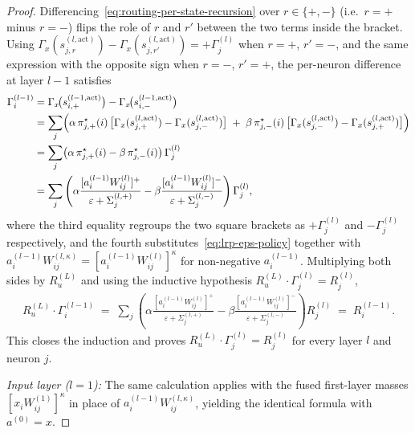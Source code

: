 \documentclass[twoside]{article}
\newcommand{\1}{\mathbf{1}}
\begin{document}
\begin{proof}
Differencing~\eqref{eq:routing-per-state-recursion} over $r \in \{+,-\}$ (i.e.\ $r{=}+$ minus
$r{=}-$) flips the role of $r$ and $r'$ between the two terms inside the bracket. Using
$\Gamma_x(s_{j,r}^{(l,\mathrm{act})}) - \Gamma_x(s_{j,r'}^{(l,\mathrm{act})}) = +\Gamma^{(l)}_j$
when $r{=}+$, $r'{=}-$, and the same expression with the opposite sign when $r{=}-$, $r'{=}+$, the
per-neuron difference at layer $l-1$ satisfies
\begin{align}
    \Gamma^{(l-1)}_i
    &=
    \Gamma_x\!\bigl(s_{i,+}^{(l-1, \mathrm{act})}\bigr) - \Gamma_x\!\bigl(s_{i,-}^{(l-1,
    \mathrm{act})}\bigr) \nonumber \\
    &=
    \sum_j \Bigl(
    \alpha\, \pi_{j,+}^\star(i)\, \bigl[\Gamma_x(s_{j,+}^{(l,\mathrm{act})}) -
    \Gamma_x(s_{j,-}^{(l,\mathrm{act})})\bigr]
    \;+\;
    \beta\, \pi_{j,-}^\star(i)\, \bigl[\Gamma_x(s_{j,-}^{(l,\mathrm{act})}) -
    \Gamma_x(s_{j,+}^{(l,\mathrm{act})})\bigr]
    \Bigr) \nonumber \\
    &=
    \sum_j \bigl(\alpha\, \pi_{j,+}^\star(i) - \beta\, \pi_{j,-}^\star(i)\bigr)\, \Gamma^{(l)}_j
    \nonumber \\
    &=
    \sum_j \left(
    \alpha \frac{[a_i^{(l-1)} W_{ij}^{(l)}]^+}{\varepsilon + \Sigma_j^{(l,+)}}
    -
    \beta \frac{[a_i^{(l-1)} W_{ij}^{(l)}]^-}{\varepsilon + \Sigma_j^{(l,-)}}
    \right) \Gamma^{(l)}_j,
\end{align}
where the third equality regroups the two square brackets as $+\Gamma^{(l)}_j$ and
$-\Gamma^{(l)}_j$ respectively, and the fourth substitutes~\eqref{eq:lrp-eps-policy} together with
$a_i^{(l-1)} W_{ij}^{(l,\kappa)} = [a_i^{(l-1)} W_{ij}^{(l)}]^\kappa$ for non-negative
$a_i^{(l-1)}$. Multiplying both sides by $R_u^{(L)}$ and using the inductive hypothesis $R_u^{(L)}
    \cdot \Gamma^{(l)}_j = R^{(l)}_j$,
\begin{align}
    R_u^{(L)} \cdot \Gamma^{(l-1)}_i
    \;=\; \sum_j \left(
    \alpha \frac{[a_i^{(l-1)} W_{ij}^{(l)}]^+}{\varepsilon + \Sigma_j^{(l,+)}}
    -
    \beta \frac{[a_i^{(l-1)} W_{ij}^{(l)}]^-}{\varepsilon + \Sigma_j^{(l,-)}}
    \right) R^{(l)}_j
    \;=\; R^{(l-1)}_i.
\end{align}
This closes the induction and proves $R_u^{(L)} \cdot \Gamma^{(l)}_j = R^{(l)}_j$ for every layer
$l$ and neuron $j$.

\emph{Input layer ($l = 1$):} The same calculation applies with the fused first-layer masses $[x_i
    W_{ij}^{(1)}]^\kappa$ in place of $a_i^{(l-1)} W_{ij}^{(l,\kappa)}$, yielding the identical formula
with $a^{(0)} = x$.


\end{proof}
\end{document}
